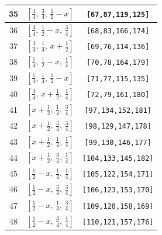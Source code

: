 \documentclass[fleqn,8pt]{jsarticle}
\begin{document}
\begin{longtable}{ccc}
35 & $\left[ \frac{3}{4},\, \frac{3}{4},\, \frac{1}{2} - x \right]$ & {\tt [67,87,119,125]} \\ \hline
36 & $\left[ \frac{3}{4},\, \frac{1}{2} - x,\, \frac{3}{4} \right]$ & {\tt [68,83,166,174]} \\ \hline
37 & $\left[ \frac{3}{4},\, \frac{1}{4},\, x + \frac{1}{2} \right]$ & {\tt [69,76,114,136]} \\ \hline
38 & $\left[ \frac{1}{4},\, \frac{1}{2} - x,\, \frac{1}{4} \right]$ & {\tt [70,78,164,179]} \\ \hline
39 & $\left[ \frac{1}{4},\, \frac{1}{4},\, \frac{1}{2} - x \right]$ & {\tt [71,77,115,135]} \\ \hline
40 & $\left[ \frac{3}{4},\, x + \frac{1}{2},\, \frac{1}{4} \right]$ & {\tt [72,79,161,180]} \\ \hline
41 & $\left[ x + \frac{1}{2},\, \frac{1}{4},\, \frac{3}{4} \right]$ & {\tt [97,134,152,181]} \\ \hline
42 & $\left[ x + \frac{1}{2},\, \frac{3}{4},\, \frac{3}{4} \right]$ & {\tt [98,129,147,178]} \\ \hline
43 & $\left[ x + \frac{1}{2},\, \frac{1}{4},\, \frac{1}{4} \right]$ & {\tt [99,130,146,177]} \\ \hline
44 & $\left[ x + \frac{1}{2},\, \frac{3}{4},\, \frac{1}{4} \right]$ & {\tt [104,133,145,182]} \\ \hline
45 & $\left[ \frac{1}{2} - x,\, \frac{1}{4},\, \frac{1}{4} \right]$ & {\tt [105,122,154,171]} \\ \hline
46 & $\left[ \frac{1}{2} - x,\, \frac{3}{4},\, \frac{3}{4} \right]$ & {\tt [106,123,153,170]} \\ \hline
47 & $\left[ \frac{1}{2} - x,\, \frac{1}{4},\, \frac{3}{4} \right]$ & {\tt [109,128,158,169]} \\ \hline
48 & $\left[ \frac{1}{2} - x,\, \frac{3}{4},\, \frac{1}{4} \right]$ & {\tt [110,121,157,176]} \\
\end{longtable}
\renewcommand{\arraystretch}{1.2}
\end{document}
